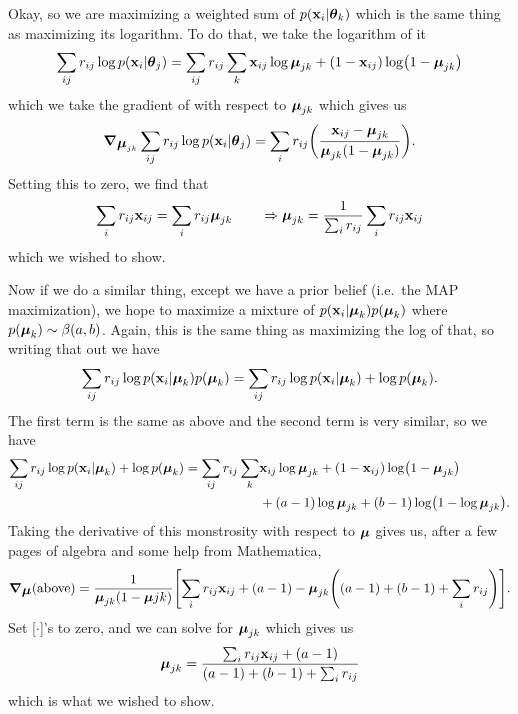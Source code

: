\documentclass[12pt,letterpaper,fleqn]{hmcpset}
\begin{document}
\begin{solution}
Okay, so we are maximizing a weighted sum of $ p(\vb x_i | \hbox{\boldmath$\theta$}_k)$ which is the same thing as maximizing its logarithm. To do that, we take the logarithm of it
\begin{align*}
\sum_{ij} r_{ij} \log p(\vb x_i | \hbox{\boldmath$\theta$}_j) = \sum_{ij} r_{ij} \sum_k \vb x_{ij} \log  \hbox{\boldmath$\mu$}_{jk} + (1 - \vb x_{ij})\log(1 - \hbox{\boldmath$\mu$}_{jk})
\end{align*}
which we take the gradient of with respect to $\hbox{\boldmath$\mu$}_{jk}$ which gives us
\begin{align*}
\grad_{\hbox{\boldmath$\mu$}_{jk}} \sum_{ij} r_{ij} \log p(\vb x_i | \hbox{\boldmath$\theta$}_j) = \sum_i r_{ij} \qty(\frac{\vb x_{ij} - \hbox{\boldmath$\mu$}_{jk}}{\hbox{\boldmath$\mu$}_{jk}(1 - \hbox{\boldmath$\mu$}_{jk})}).
\end{align*}
Setting this to zero, we find that
\begin{align*}
\sum_i r_{ij} \vb x_{ij} = \sum_i r_{ij} \hbox{\boldmath$\mu$}_{jk} \qquad \Rightarrow \hbox{\boldmath$\mu$}_{jk} = \frac{1}{\sum_i r_{ij}}\sum_i r_{ij} \vb x_{ij}
\end{align*}
which we wished to show. 

Now if we do a similar thing, except we have a prior belief (i.e.\ the MAP maximization), we hope to maximize a mixture of $p(\vb x_i | \hbox{\boldmath$\mu$}_k) p(\hbox{\boldmath$\mu$}_k)$ where $p(\hbox{\boldmath$\mu$}_k) \sim \beta(a,b)$. Again, this is the same thing as maximizing the log of that, so writing that out we have
\begin{align*}
\sum_{ij} r_{ij} \log p(\vb x_i | \hbox{\boldmath$\mu$}_k) p(\hbox{\boldmath$\mu$}_k) = \sum_{ij} r_{ij} \log p(\vb x_i | \hbox{\boldmath$\mu$}_k)  + \log p(\hbox{\boldmath$\mu$}_k).
\end{align*}
The first term is the same as above and the second term is very similar, so we have
\begin{align*}
\sum_{ij} r_{ij} \log p(\vb x_i | \hbox{\boldmath$\mu$}_k)  + \log p(\hbox{\boldmath$\mu$}_k) = \sum_{ij} r_{ij} \sum_k & \vb x_{ij} \log  \hbox{\boldmath$\mu$}_{jk} + (1 - \vb x_{ij})\log(1 - \hbox{\boldmath$\mu$}_{jk}) \\ &+ (a-1) \log  \hbox{\boldmath$\mu$}_{jk} + (b - 1) \log (1 - \log \hbox{\boldmath$\mu$}_{jk}). 
\end{align*}
Taking the derivative of this monstrosity with respect to $\hbox{\boldmath$\mu$}$ gives us, after a few pages of algebra and some help from Mathematica, 
\begin{align*}
\grad_{\hbox{\boldmath$\mu$}} ({\rm above}) = \frac{1}{\hbox{\boldmath$\mu$}_{jk}(1 - \hbox{\boldmath$\mu$}{jk})} \qty[\sum_i r_{ij} \vb x_{ij}  + (a - 1) - \hbox{\boldmath$\mu$}_{jk}\qty((a -1) + (b -1) + \sum_i r_{ij})].
\end{align*}
Set [$\cdot$]'s to zero, and we can solve for $\hbox{\boldmath$\mu$}_{jk}$ which gives us 
\begin{align*}
\hbox{\boldmath$\mu$}_{jk} = \frac{\sum_i r_{ij} \vb x_{ij} + (a - 1)}{(a -1) + (b -1) + \sum_i r_{ij}}
\end{align*}
which is what we wished to show.



\vfill
\end{solution}
\newpage
\end{document}
